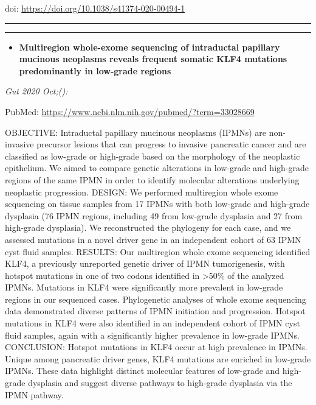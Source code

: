 \documentclass[
]{article}
\providecommand{\tightlist}{%
  \setlength{\itemsep}{0pt}\setlength{\parskip}{0pt}}
\begin{document}
doi: \url{https://doi.org/10.1038/s41374-020-00494-1}

\begin{center}\rule{0.5\linewidth}{0.5pt}\end{center}

\begin{center}\rule{0.5\linewidth}{0.5pt}\end{center}

\begin{itemize}
\tightlist
\item
  \textbf{Multiregion whole-exome sequencing of intraductal papillary
  mucinous neoplasms reveals frequent somatic KLF4 mutations
  predominantly in low-grade regions}
\end{itemize}

\emph{Gut 2020 Oct;():}

PubMed: \url{https://www.ncbi.nlm.nih.gov/pubmed/?term=33028669}

OBJECTIVE: Intraductal papillary mucinous neoplasms (IPMNs) are
non-invasive precursor lesions that can progress to invasive pancreatic
cancer and are classified as low-grade or high-grade based on the
morphology of the neoplastic epithelium. We aimed to compare genetic
alterations in low-grade and high-grade regions of the same IPMN in
order to identify molecular alterations underlying neoplastic
progression. DESIGN: We performed multiregion whole exome sequencing on
tissue samples from 17 IPMNs with both low-grade and high-grade
dysplasia (76 IPMN regions, including 49 from low-grade dysplasia and 27
from high-grade dysplasia). We reconstructed the phylogeny for each
case, and we assessed mutations in a novel driver gene in an independent
cohort of 63 IPMN cyst fluid samples. RESULTS: Our multiregion whole
exome sequencing identified KLF4, a previously unreported genetic driver
of IPMN tumorigenesis, with hotspot mutations in one of two codons
identified in \textgreater50\% of the analyzed IPMNs. Mutations in KLF4
were significantly more prevalent in low-grade regions in our sequenced
cases. Phylogenetic analyses of whole exome sequencing data demonstrated
diverse patterns of IPMN initiation and progression. Hotspot mutations
in KLF4 were also identified in an independent cohort of IPMN cyst fluid
samples, again with a significantly higher prevalence in low-grade
IPMNs. CONCLUSION: Hotspot mutations in KLF4 occur at high prevalence in
IPMNs. Unique among pancreatic driver genes, KLF4 mutations are enriched
in low-grade IPMNs. These data highlight distinct molecular features of
low-grade and high-grade dysplasia and suggest diverse pathways to
high-grade dysplasia via the IPMN pathway.
\end{document}
